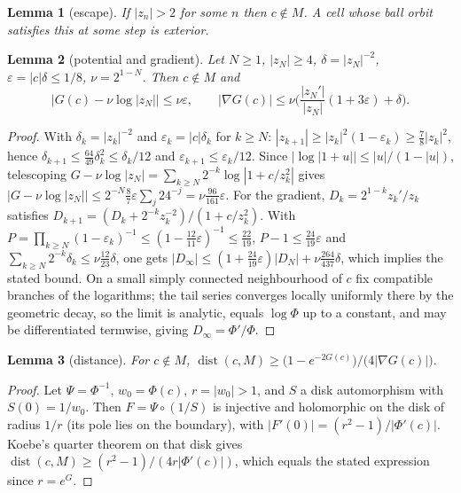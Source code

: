 \documentclass[11pt]{article}
\newtheorem{lemma}{Lemma}
\begin{document}
\begin{lemma}[escape]
If $|z_n|>2$ for some $n$ then $c\notin M$. A cell whose ball orbit satisfies this at some step is exterior.
\end{lemma}

\begin{lemma}[potential and gradient]\label{lem:tail}
Let $N\ge1$, $|z_N|\ge4$, $\delta=|z_N|^{-2}$, $\varepsilon=|c|\delta\le1/8$, $\nu=2^{1-N}$. Then $c\notin M$ and
\[
  \big|G(c)-\nu\log|z_N|\big|\le\nu\varepsilon,\qquad
  |\nabla G(c)|\le\nu\Big(\frac{|z_N'|}{|z_N|}(1+3\varepsilon)+\delta\Big).
\]
\end{lemma}
\begin{proof}
With $\delta_k=|z_k|^{-2}$ and $\varepsilon_k=|c|\delta_k$ for $k\ge N$: $|z_{k+1}|\ge|z_k|^2(1-\varepsilon_k)\ge\frac78|z_k|^2$, hence $\delta_{k+1}\le\frac{64}{49}\delta_k^2\le\delta_k/12$ and $\varepsilon_{k+1}\le\varepsilon_k/12$. Since $|\log|1+u||\le|u|/(1-|u|)$, telescoping $G-\nu\log|z_N|=\sum_{k\ge N}2^{-k}\log|1+c/z_k^2|$ gives $|G-\nu\log|z_N||\le2^{-N}\frac87\varepsilon\sum_j24^{-j}=\nu\frac{96}{161}\varepsilon$. For the gradient, $D_k=2^{1-k}z_k'/z_k$ satisfies $D_{k+1}=(D_k+2^{-k}z_k^{-2})/(1+c/z_k^2)$. With $P=\prod_{k\ge N}(1-\varepsilon_k)^{-1}\le(1-\frac{12}{11}\varepsilon)^{-1}\le\frac{22}{19}$, $P-1\le\frac{24}{19}\varepsilon$ and $\sum_{k\ge N}2^{-k}\delta_k\le\nu\frac{12}{23}\delta$, one gets $|D_\infty|\le(1+\frac{24}{19}\varepsilon)|D_N|+\nu\frac{264}{437}\delta$, which implies the stated bound. On a small simply connected neighbourhood of $c$ fix compatible branches of the logarithms; the tail series converges locally uniformly there by the geometric decay, so the limit is analytic, equals $\log\Phi$ up to a constant, and may be differentiated termwise, giving $D_\infty=\Phi'/\Phi$.
\end{proof}

\begin{lemma}[distance]\label{lem:koebe}
For $c\notin M$, $\operatorname{dist}(c,M)\ge\big(1-e^{-2G(c)}\big)/\big(4|\nabla G(c)|\big)$.
\end{lemma}
\begin{proof}
Let $\Psi=\Phi^{-1}$, $w_0=\Phi(c)$, $r=|w_0|>1$, and $S$ a disk automorphism with $S(0)=1/w_0$. Then $F=\Psi\circ(1/S)$ is injective and holomorphic on the disk of radius $1/r$ (its pole lies on the boundary), with $|F'(0)|=(r^2-1)/|\Phi'(c)|$. Koebe's quarter theorem \cite{duren1983} on that disk gives $\operatorname{dist}(c,M)\ge(r^2-1)/(4r|\Phi'(c)|)$, which equals the stated expression since $r=e^{G}$.
\end{proof}
\end{document}
